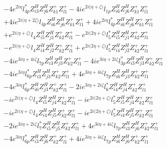 \begin{align}
 &-4 e^{2 i \eta } l_{4p}^* Z_{{i 3}}^{H} Z_{{j 6}}^{H} Z_{{k 1}}^{+} Z_{{l 1}}^{+} -4 i e^{2 i \Big(\eta +\zeta \Big)} l_{1p} Z_{{i 6}}^{H} Z_{{j 6}}^{H} Z_{{k 1}}^{+} Z_{{l 1}}^{+} \nonumber \\ 
 &+4 i e^{2 i \Big(\eta +2 \zeta \Big)} l_{4p} Z_{{i 6}}^{H} Z_{{j 6}}^{H} Z_{{k 1}}^{+} Z_{{l 1}}^{+} +4 i e^{2 i \eta } l_{4p}^* Z_{{i 6}}^{H} Z_{{j 6}}^{H} Z_{{k 1}}^{+} Z_{{l 1}}^{+} \nonumber \\ 
 &+e^{2 i \Big(\eta +\zeta \Big)} l_4 Z_{{i 5}}^{H} Z_{{j 1}}^{H} Z_{{k 2}}^{+} Z_{{l 1}}^{+} - e^{2 i \Big(2 \eta +\zeta \Big)} l_5^* Z_{{i 5}}^{H} Z_{{j 1}}^{H} Z_{{k 2}}^{+} Z_{{l 1}}^{+} \nonumber \\ 
 &- e^{2 i \Big(\eta +\zeta \Big)} l_4 Z_{{i 4}}^{H} Z_{{j 2}}^{H} Z_{{k 2}}^{+} Z_{{l 1}}^{+} +e^{2 i \Big(2 \eta +\zeta \Big)} l_5^* Z_{{i 4}}^{H} Z_{{j 2}}^{H} Z_{{k 2}}^{+} Z_{{l 1}}^{+} \nonumber \\ 
 &-4 i e^{3 i \eta +4 i \zeta } l_{7p} Z_{{i 3}}^{H} Z_{{j 3}}^{H} Z_{{k 2}}^{+} Z_{{l 1}}^{+} -4 i e^{3 i \eta +2 i \zeta } l_{3p}^* Z_{{i 3}}^{H} Z_{{j 3}}^{H} Z_{{k 2}}^{+} Z_{{l 1}}^{+} \nonumber \\ 
 &-4 i e^{3 i \eta } l_{6p}^* Z_{{i 3}}^{H} Z_{{j 3}}^{H} Z_{{k 2}}^{+} Z_{{l 1}}^{+} +4 e^{3 i \eta +4 i \zeta } l_{7p} Z_{{i 6}}^{H} Z_{{j 3}}^{H} Z_{{k 2}}^{+} Z_{{l 1}}^{+} \nonumber \\ 
 &-4 e^{3 i \eta } l_{6p}^* Z_{{i 6}}^{H} Z_{{j 3}}^{H} Z_{{k 2}}^{+} Z_{{l 1}}^{+} -2 i e^{3 i \eta +2 i \zeta } l_6^* Z_{{i 4}}^{H} Z_{{j 4}}^{H} Z_{{k 2}}^{+} Z_{{l 1}}^{+} \nonumber \\ 
 &-i e^{2 i \Big(\eta +\zeta \Big)} l_4 Z_{{i 5}}^{H} Z_{{j 4}}^{H} Z_{{k 2}}^{+} Z_{{l 1}}^{+} -i e^{2 i \Big(2 \eta +\zeta \Big)} l_5^* Z_{{i 5}}^{H} Z_{{j 4}}^{H} Z_{{k 2}}^{+} Z_{{l 1}}^{+} \nonumber \\ 
 &-i e^{2 i \Big(\eta +\zeta \Big)} l_4 Z_{{i 4}}^{H} Z_{{j 5}}^{H} Z_{{k 2}}^{+} Z_{{l 1}}^{+} -i e^{2 i \Big(2 \eta +\zeta \Big)} l_5^* Z_{{i 4}}^{H} Z_{{j 5}}^{H} Z_{{k 2}}^{+} Z_{{l 1}}^{+} \nonumber \\ 
 &-2 i e^{3 i \eta +2 i \zeta } l_7^* Z_{{i 5}}^{H} Z_{{j 5}}^{H} Z_{{k 2}}^{+} Z_{{l 1}}^{+} +4 e^{3 i \eta +4 i \zeta } l_{7p} Z_{{i 3}}^{H} Z_{{j 6}}^{H} Z_{{k 2}}^{+} Z_{{l 1}}^{+} \nonumber \\ 
 &-4 e^{3 i \eta } l_{6p}^* Z_{{i 3}}^{H} Z_{{j 6}}^{H} Z_{{k 2}}^{+} Z_{{l 1}}^{+} +4 i e^{3 i \eta +4 i \zeta } l_{7p} Z_{{i 6}}^{H} Z_{{j 6}}^{H} Z_{{k 2}}^{+} Z_{{l 1}}^{+} \nonumber \\ 

\end{align}
